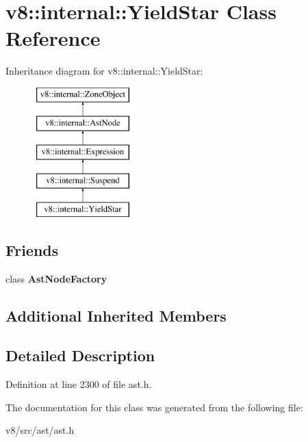 \hypertarget{classv8_1_1internal_1_1YieldStar}{}\section{v8\+:\+:internal\+:\+:Yield\+Star Class Reference}
\label{classv8_1_1internal_1_1YieldStar}
Inheritance diagram for v8\+:\+:internal\+:\+:Yield\+Star\+:\begin{figure}[H]
\begin{center}
\leavevmode
\includegraphics[height=5.000000cm]{classv8_1_1internal_1_1YieldStar}
\end{center}
\end{figure}
\subsection*{Friends}
\begin{DoxyCompactItemize}
\item 
\mbox{\label{classv8_1_1internal_1_1YieldStar_a8d587c8ad3515ff6433eb83c578e795f}} 
class {\bfseries Ast\+Node\+Factory}
\end{DoxyCompactItemize}
\subsection*{Additional Inherited Members}


\subsection{Detailed Description}


Definition at line 2300 of file ast.\+h.



The documentation for this class was generated from the following file\+:\begin{DoxyCompactItemize}
\item 
v8/src/ast/ast.\+h\end{DoxyCompactItemize}

